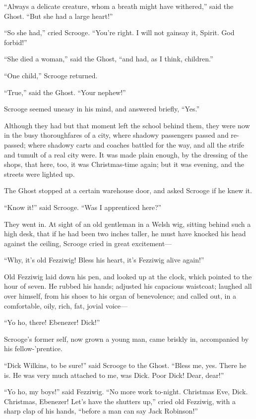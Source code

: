 \documentclass[paper=5.5in:8.5in,BCOR=15mm,twoside,DIV=15,headinclude=off,12pt,chapterprefix=off,openany,headings=huge]{scrbook} %
\begin{document}
\enquote{Always a delicate creature, whom a breath might have withered,} said the Ghost. \enquote{But she had a large heart!}

\enquote{So she had,} cried Scrooge. \enquote{You're right. I will not gainsay it, Spirit. God forbid!}

\enquote{She died a woman,} said the Ghost, \enquote{and had, as I think, children.}

\enquote{One child,} Scrooge returned.

\enquote{True,} said the Ghost. \enquote{Your nephew!}

Scrooge seemed uneasy in his mind, and answered briefly, \enquote{Yes.}

Although they had but that moment left the school behind them, they were now in the busy thoroughfares of a city, where shadowy passengers passed and re-passed; where shadowy carts and coaches battled for the way, and all the strife and tumult of a real city were. It was made plain enough, by the dressing of the shops, that here, too, it was Christmas-time again; but it was evening, and the streets were lighted up.

The Ghost stopped at a certain warehouse door, and asked Scrooge if he knew it.

\enquote{Know it!} said Scrooge. \enquote{Was I apprenticed here?}

They went in. At sight of an old gentleman in a Welsh wig, sitting behind such a high desk, that if he had been two inches taller, he must have knocked his head against the ceiling, Scrooge cried in great excitement—

\enquote{Why, it's old Fezziwig! Bless his heart, it's Fezziwig alive again!}

Old Fezziwig laid down his pen, and looked up at the clock, which pointed to the hour of seven. He rubbed his hands; adjusted his capacious waistcoat; laughed all over himself, from his shoes to his organ of benevolence; and called out, in a comfortable, oily, rich, fat, jovial voice—

\enquote{Yo ho, there! Ebenezer! Dick!}

Scrooge's former self, now grown a young man, came briskly in, accompanied by his fellow-'prentice.

\enquote{Dick Wilkins, to be sure!} said Scrooge to the Ghost. \enquote{Bless me, yes. There he is. He was very much attached to me, was Dick. Poor Dick! Dear, dear!}

\enquote{Yo ho, my boys!} said Fezziwig. \enquote{No more work to-night. Christmas Eve, Dick. Christmas, Ebenezer! Let's have the shutters up,} cried old Fezziwig, with a sharp clap of his hands, \enquote{before a man can say Jack Robinson!}
\end{document}
